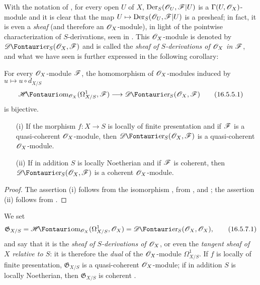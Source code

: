 \begin{env}[16.5.4]
\label{IV.16.5.4}
With the notation of , for every open $U$ of $X$, $\operatorname{Der}_S(\mathscr{O}_U, \mathscr{F}|U)$ is a $\Gamma(U, \mathscr{O}_X)$-module and it is clear that the map $U \mapsto \Der_S(\sh{O}_U, \sh{F}|U)$ is a presheaf;
in fact, it is even a \emph{sheaf} (and therefore an $\mathscr{O}_X$-module), in light of the pointwise characterization of $S$-derivations, seen in .
This $\mathscr{O}_X$-module is denoted by $\shDer_S(\sh{O}_X, \sh{F})$ and is called the \emph{sheaf of $S$-derivations of $\mathscr{O}_X$ in $\mathscr{F}$}, and what we have seen is further expressed in the following corollary:
\end{env}

\begin{corollary}[16.5.5]
\label{IV.16.5.5}
For every $\mathscr{O}_X$-module $\mathscr{F}$, the homomorphism of $\mathscr{O}_X$-modules induced by $u \mapsto u \circ d_{X/S}$
\[
\label{IV.16.5.5.1}
  \shHom_{\sh{O}_X}(\Omega_{X/S}^1, \sh{F}) \to \shDer_S(\sh{O}_X, \sh{F})
  \tag{16.5.5.1}
\]
is bijective.
\end{corollary}

\begin{corollary}[16.5.6]
\label{IV.16.5.6}
\begin{enumerate}
  \item[{\rm(i)}] If the morphism $f : X \to S$ is locally of finite presentation and if $\mathscr{F}$ is a quasi-coherent $\mathscr{O}_X$-module, then $\shDer_S(\sh{O}_X, \sh{F})$ is a quasi-coherent $\mathscr{O}_X$-module.
  \item[{\rm(ii)}] If in addition $S$ is locally Noetherian and if $\mathscr{F}$ is coherent, then $\shDer_S(\sh{O}_X, \sh{F})$ is a coherent $\mathscr{O}_X$-module.
\end{enumerate}
\end{corollary}

\begin{proof}
The assertion (i) follows from the isomorphism , from , and ;
the assertion (ii) follows from .
\end{proof}

\begin{env}[16.5.7]
\label{IV.16.5.7}
We set
\[
\label{IV.16.5.7.1}
  \mathfrak{G}_{X/S} = \shHom_{\sh{O}_X}(\Omega_{X/S}^1, \sh{O}_X) = \shDer_S(\sh{O}_X, \sh{O}_X),
  \tag{16.5.7.1}
\]
and say that it is the \emph{sheaf of $S$-derivations of $\mathscr{O}_X$}, or even the \emph{tangent sheaf of $X$ relative to $S$}:
it is therefore the \emph{dual} of the $\mathscr{O}_X$-module $\Omega_{X/S}^1$.
If $f$ is locally of finite presentation,
$\mathfrak{G}_{X/S}$ is a quasi-coherent $\mathscr{O}_X$-module;
if in addition $S$ is locally Noetherian, then $\mathfrak{G}_{X/S}$ is coherent .
\end{env}

